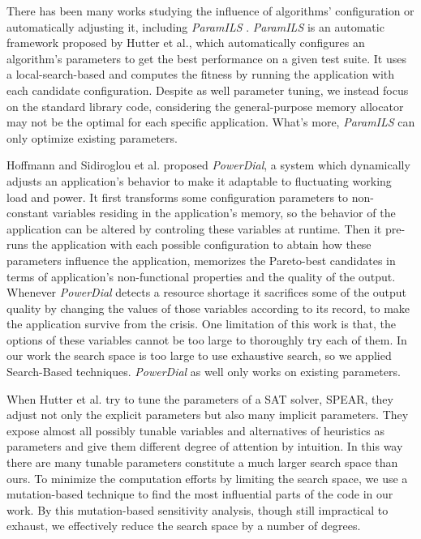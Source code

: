 There has been many works studying the influence of algorithms' configuration or automatically adjusting it, including \emph{ParamILS} \cite{hutter2009paramils}. \emph{ParamILS} is an automatic framework proposed by Hutter et al., which automatically configures an algorithm's parameters to get the best performance on a given test suite. It uses a local-search-based and computes the fitness by running the application with each candidate configuration. Despite as well parameter tuning, we instead focus on the standard library code, considering the general-purpose memory allocator may not be the optimal for each specific application. What's more, \emph{ParamILS} can only optimize existing parameters. 

Hoffmann and Sidiroglou et al. \cite{Hoffmann:2011:DKR:1950365.1950390} proposed \emph{PowerDial}, a system which dynamically adjusts an application's behavior to make it adaptable to fluctuating working load and power. It first transforms some configuration parameters to non-constant variables residing in the application's memory, so the behavior of the application can be altered by controling these variables at runtime. Then it pre-runs the application with each possible configuration to abtain how these parameters influence the application, memorizes the Pareto-best candidates in terms of application's non-functional properties and the quality of the output. Whenever \emph{PowerDial} detects a resource shortage it sacrifices some of the output quality by changing the values of those variables according to its record, to make the application survive from the crisis. One limitation of this work is that, the options of these variables cannot be too large to thoroughly try each of them. In our work the search space is too large to use exhaustive search, so we applied Search-Based techniques. \emph{PowerDial} as well only works on existing parameters.

When Hutter et al. \cite{4401979} try to tune the parameters of a SAT solver, SPEAR, they adjust not only the explicit parameters but also many implicit parameters. They expose almost all possibly tunable variables and alternatives of heuristics as parameters and give them different degree of attention by intuition. In this way there are many tunable parameters constitute a much larger search space than ours. To minimize the computation efforts by limiting the search space, we use a mutation-based technique to find the most influential parts of the code in our work. By this mutation-based sensitivity analysis, though still impractical to exhaust, we effectively reduce the search space by a number of degrees.
